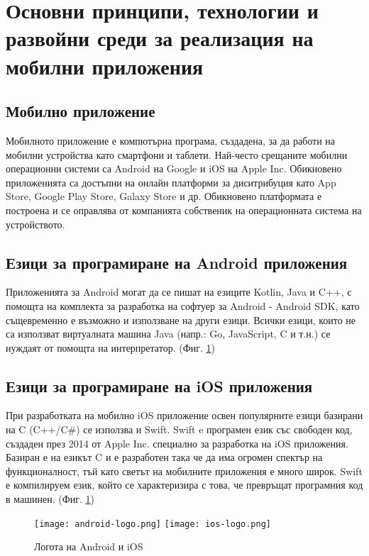 \section{Основни принципи, технологии и развойни среди за реализация на мобилни приложения}
\subsection{Мобилно приложение}
Мобилното приложение е компютърна програма, създадена, за да работи на мобилни устройства като смартфони и таблети. Най-често срещаните мобилни операционни системи са Android на Google и iOS на Apple Inc. Обикновено приложенията са достъпни на онлайн платформи за диситрибуция като App Store, Google Play Store, Galaxy Store и др. Обикновено платформата е построена и се оправлява от компанията собственик на операционната система на устройството.

\subsection{Езици за програмиране на Android приложения}
Приложенията за Android могат да се пишат на езиците Kotlin, Java и C++, с помощта на комплекта за разработка на софтуер за Android - Android SDK, като същевременно е възможно и използване на други езици. Всички езици, които не са използват виртуалната машина Java (напр.: Go, JavaScript, C и т.н.) се нуждаят от помощта на интерпретатор. (Фиг. \ref{fig:android-ios-logos})

\subsection{Езици за програмиране на iOS приложения}
При разработката на мобилно iOS приложение освен популярните езици базирани на C (C++/C\#) се използва и Swift. Swift e програмен език със свободен код, създаден през 2014 от Apple Inc. специално за разработка на iOS приложения. Базиран е на езикът C и е разработен така че да има огромен спектър на функционалност, тъй като светът на мобилните приложения е много широк. Swift е компилируем език, който се характеризира с това, че превръщат програмния код в машинен. (Фиг. \ref{fig:android-ios-logos})

\begin{figure}[H]
    \texttt{[image: android-logo.png]}
    \texttt{[image: ios-logo.png]}
    \centering
    \caption{Логота на Android и iOS}
    \label{fig:android-ios-logos}
\end{figure}


